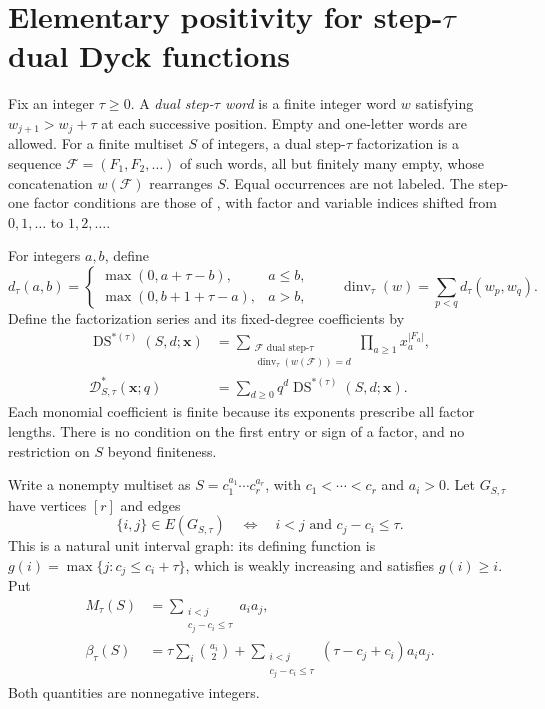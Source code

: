 \documentclass[11pt]{article}
\theoremstyle{remark}
\newcommand{\xx}{\mathbf x}
\DeclareMathOperator{\dinv}{dinv}
\DeclareMathOperator{\DS}{DS}
\numberwithin{equation}{section}
\begin{document}
\section{Elementary positivity for step-\texorpdfstring{$\tau$}{tau} dual Dyck functions}\label{sec:dyck}

Fix an integer $\tau\geq0$. A \emph{dual step-$\tau$ word} is a finite
integer word $w$ satisfying $w_{j+1}>w_j+\tau$ at each successive
position. Empty and one-letter words are allowed. For a finite multiset
$S$ of integers, a dual step-$\tau$ factorization is a sequence
$\mathcal F=(F_1,F_2,\ldots)$ of such words, all but finitely many empty,
whose concatenation $w(\mathcal F)$ rearranges $S$. Equal occurrences
are not labeled. The step-one factor conditions are those of
\cite[Definitions~2.3--2.4]{Hawkes}, with factor and variable indices
shifted from $0,1,\ldots$ to $1,2,\ldots$.

For integers $a,b$, define
\begin{equation}\label{eq:pair-stat}
 d_\tau(a,b)=
 \begin{cases}
  \max(0,a+\tau-b),&a\leq b,\\
  \max(0,b+1+\tau-a),&a>b,
 \end{cases}
 \qquad
 \dinv_\tau(w)=\sum_{p<q}d_\tau(w_p,w_q).
\end{equation}
Define the factorization series and its fixed-degree coefficients by
\begin{equation}\label{eq:dual-dyck}
 \begin{aligned}
 \DS^{*(\tau)}(S,d;\xx)
   &=\sum_{\substack{\mathcal F\text{ dual step-}\tau\\
                     \dinv_\tau(w(\mathcal F))=d}}
                   \prod_{a\geq1}x_a^{|F_a|},\\
 \mathcal D^*_{S,\tau}(\xx;q)
   &=\sum_{d\geq0}q^d\DS^{*(\tau)}(S,d;\xx).
 \end{aligned}
\end{equation}
Each monomial coefficient is finite because its exponents prescribe all
factor lengths. There is no condition on the first entry or sign of a
factor, and no restriction on $S$ beyond finiteness.

Write a nonempty multiset as $S=c_1^{a_1}\cdots c_r^{a_r}$, with
$c_1<\cdots<c_r$ and $a_i>0$. Let $G_{S,\tau}$ have vertices $[r]$
and edges
\begin{equation}\label{eq:dyck-graph}
 \{i,j\}\in E(G_{S,\tau})\quad\Longleftrightarrow\quad
 i<j\text{ and }c_j-c_i\leq\tau.
\end{equation}
This is a natural unit interval graph: its defining function is
$g(i)=\max\{j:c_j\leq c_i+\tau\}$, which is weakly increasing and
satisfies $g(i)\geq i$. Put
\begin{equation}\label{eq:dyck-shift}
 \begin{aligned}
 M_\tau(S)&=\sum_{\substack{i<j\\c_j-c_i\leq\tau}}a_i a_j,\\
 \beta_\tau(S)&=\tau\sum_i\binom{a_i}{2}
   +\sum_{\substack{i<j\\c_j-c_i\leq\tau}}
          (\tau-c_j+c_i)a_i a_j.
 \end{aligned}
\end{equation}
Both quantities are nonnegative integers.
\end{document}
